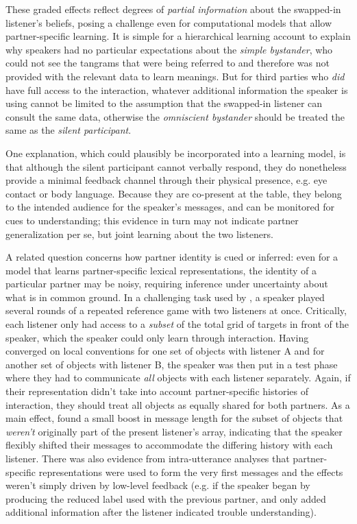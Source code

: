 \documentclass[11pt, floatsintext, jou]{apa6}
\begin{document}
These graded effects reflect degrees of \emph{partial information} about the swapped-in listener's beliefs, posing a challenge even for computational models that allow partner-specific learning. It is simple for a hierarchical learning account to explain why speakers had no particular expectations about the \emph{simple bystander}, who could not see the tangrams that were being referred to and therefore was not provided with the relevant data to learn meanings. But for third parties who \emph{did} have full access to the interaction, whatever additional information the speaker is using cannot be limited to the assumption that the swapped-in listener can consult the same data, otherwise the \emph{omniscient bystander} should be treated the same as the \emph{silent participant}. 

One explanation, which could plausibly be incorporated into a learning model, is that although the silent participant cannot verbally respond, they do nonetheless provide a minimal feedback channel through their physical presence, e.g. eye contact or body language. Because they are co-present at the table, they belong to the intended audience for the speaker's messages, and can be monitored for cues to understanding; this evidence in turn may not indicate partner generalization per se, but joint learning about the two listeners. 

A related question concerns how partner identity is cued or inferred: even for a model that learns partner-specific lexical representations, the identity of a particular partner may be noisy, requiring inference under uncertainty about what is in common ground. In a challenging task used by , a speaker played several rounds of a repeated reference game with two listeners at once. Critically, each listener only had access to a \emph{subset} of the total grid of targets in front of the speaker, which the speaker could only learn through interaction. Having converged on local conventions for one set of objects with listener A and for another set of objects with listener B, the speaker was then put in a test phase where they had to communicate \emph{all} objects with each listener separately. Again, if their representation didn't take into account partner-specific histories of interaction, they should treat all objects as equally shared for both partners. As a main effect,  found a small boost in message length for the subset of objects that \emph{weren't} originally part of the present listener's array, indicating that the speaker flexibly shifted their messages to accommodate the differing history with each listener. There was also evidence from intra-utterance analyses that partner-specific representations were used to form the very first messages and the effects weren't simply driven by low-level feedback (e.g. if the speaker began by producing the reduced label used with the previous partner, and only added additional information after the listener indicated trouble understanding). 
\end{document}
